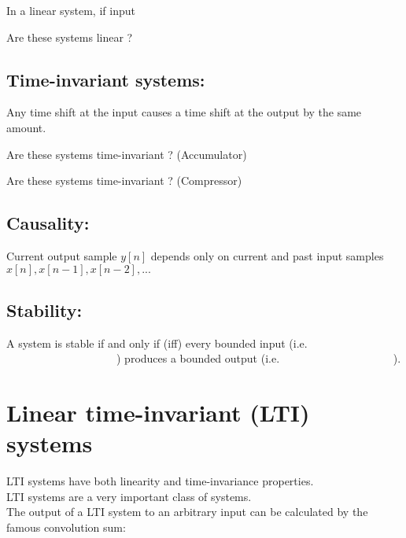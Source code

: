 \documentclass[10pt,a4paper,report]{report}       %
\begin{document}
In a linear system, if input \\ 
\vspace{2cm}

\ex Are these systems linear ?\\
\vspace{9cm}

\subsection{Time-invariant systems:} 
Any time shift at the input causes a time shift at the output by the same amount.\\
\vspace{2cm}

\ex Are these systems time-invariant ? (Accumulator)
\vspace{4cm}

\ex Are these systems time-invariant ? (Compressor)
\vspace{3cm}

\subsection{Causality:}
Current output sample $y[n]$ depends only on current and past input samples $x[n], x[n-1],x[n-2],...$\\
\ex
\vspace{3cm}

\subsection{Stability:}
A system is stable if and only if (iff) every bounded input (i.e. $\qquad \qquad \qquad\qquad\qquad$) produces a bounded output (i.e. $\qquad \qquad \qquad\qquad\qquad$).\\
\ex 
\vspace{6cm}


\section{Linear time-invariant (LTI) systems}
LTI systems have both linearity and time-invariance properties.\\ 
LTI systems are a very important class of systems.\\
The output of a LTI system to an arbitrary input can be calculated by the famous convolution sum:
\vspace{5cm}\\
\vspace{4cm}\\
\end{document}
